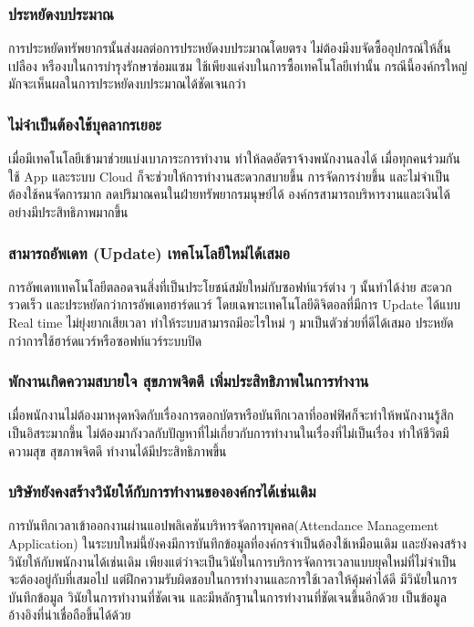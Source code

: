 \subsubsection{ประหยัดงบประมาณ}   
\quad การประหยัดทรัพยากรนั้นส่งผลต่อการประหยัดงบประมาณโดยตรง ไม่ต้องมีงบจัดซื้ออุปกรณ์ให้สิ้นเปลือง หรืองบในการบำรุงรักษาซ่อมแซม ใช้เพียงแค่งบในการซื้อเทคโนโลยีเท่านั้น กรณีนี้องค์กรใหญ่มักจะเห็นผลในการประหยัดงบประมาณได้ชัดเจนกว่า 
\subsubsection{ไม่จำเป็นต้องใช้บุคลากรเยอะ}  
\quad เมื่อมีเทคโนโลยีเข้ามาช่วยแบ่งเบาภาระการทำงาน ทำให้ลดอัตราจ้างพนักงานลงได้ เมื่อทุกคนร่วมกันใช้ App และระบบ Cloud ก็จะช่วยให้การทำงานสะดวกสบายขึ้น การจัดการง่ายขึ้น และไม่จำเป็นต้องใช้คนจัดการมาก ลดปริมาณคนในฝ่ายทรัพยากรมนุษย์ได้ องค์กรสามารถบริหารงานและเงินได้อย่างมีประสิทธิภาพมากขึ้น 
\subsubsection{สามารถอัพเดท (Update) เทคโนโลยีใหม่ได้เสมอ}
\quad การอัพเดทเทคโนโลยีตลอดจนสิ่งที่เป็นประโยชน์สมัยใหม่กับซอฟท์แวร์ต่าง ๆ นั้นทำได้ง่าย สะดวก รวดเร็ว และประหยัดกว่าการอัพเดทฮาร์ดแวร์ โดยเฉพาะเทคโนโลยีดิจิตอลที่มีการ Update ได้แบบ Real time ไม่ยุ่งยากเสียเวลา ทำให้ระบบสามารถมีอะไรใหม่ ๆ มาเป็นตัวช่วยที่ดีได้เสมอ ประหยัดกว่าการใช้ฮาร์ดแวร์หรือซอฟท์แวร์ระบบปิด 
\subsubsection{พักงานเกิดความสบายใจ สุขภาพจิตดี เพิ่มประสิทธิภาพในการทำงาน}
\quad เมื่อพนักงานไม่ต้องมาหงุดหงิดกับเรื่องการตอกบัตรหรือบันทึกเวลาที่ออฟฟิศก็จะทำให้พนักงานรู้สึกเป็นอิสระมากขึ้น ไม่ต้องมากังวลกับปัญหาที่ไม่เกี่ยวกับการทำงานในเรื่องที่ไม่เป็นเรื่อง ทำให้ชีวิตมีความสุข สุขภาพจิตดี ทำงานได้มีประสิทธิภาพขึ้น 
\subsubsection{บริษัทยังคงสร้างวินัยให้กับการทำงานขององค์กรได้เช่นเดิม}  
\quad การบันทึกเวลาเข้าออกงานผ่านแอปพลิเคชันบริหารจัดการบุคคล(Attendance Management Application) ในระบบใหม่นี้ยังคงมีการบันทึกข้อมูลที่องค์กรจำเป็นต้องใช้เหมือนเดิม และยังคงสร้างวินัยให้กับพนักงานได้เช่นเดิม เพียงแต่ว่าจะเป็นวินัยในการบริการจัดการเวลาแบบยุคใหม่ที่ไม่จำเป็นจะต้องอยู่กับที่เสมอไป แต่ฝึกความรับผิดชอบในการทำงานและการใช้เวลาให้คุ้มค่าได้ดี มีวินัยในการบันทึกข้อมูล วินัยในการทำงานที่ชัดเจน และมีหลักฐานในการทำงานที่ชัดเจนขึ้นอีกด้วย เป็นข้อมูลอ้างอิงที่น่าเชื่อถือขึ้นได้ด้วย 

